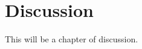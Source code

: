 \documentclass[a4paper, UKenglish, 11pt]{uiomaster}
\begin{document}
\chapter{Discussion}
This will be a chapter of discussion.

\end{document}
